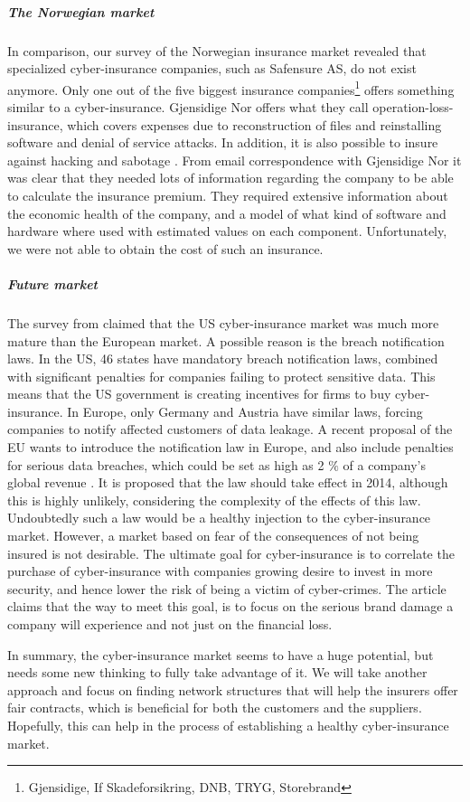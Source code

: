 \subparagraph{The Norwegian market}

In comparison, our survey of the Norwegian insurance market revealed that specialized cyber-insurance companies, such as Safensure AS, do not exist anymore. Only one out of the five biggest insurance companies\footnote{Gjensidige, If Skadeforsikring, DNB, TRYG, Storebrand} offers something similar to a cyber-insurance. Gjensidige Nor offers what they call operation-loss-insurance, which covers expenses due to reconstruction of files and reinstalling software and denial of service attacks. In addition, it is also possible to insure against hacking and sabotage \citep{gjensidige}. From email correspondence with Gjensidige Nor it was clear that they needed lots of information regarding the company to be able to calculate the insurance premium. They required extensive information about the economic health of the company, and a model of what kind of software and hardware where used with estimated values on each component. Unfortunately, we were not able to obtain the cost of such an insurance.
  
\subparagraph{Future market}
The survey from \cite{CFCunder} claimed that the US cyber-insurance market was much more mature than the European market. A possible reason is the breach notification laws. In the US, 46 states have mandatory breach notification laws, combined with significant penalties for companies failing to protect sensitive data. This means that the US government is creating incentives for firms to buy cyber-insurance.
 In Europe, only Germany and Austria have similar laws, forcing companies to notify affected customers of data leakage. A recent proposal of the EU wants to introduce the notification law in Europe, and also include penalties for serious data breaches, which could be set as high as 2 $\%$ of a company's global revenue \cite{CFCunder}. It is proposed that the law should take effect in 2014, although this is highly unlikely, considering the complexity of the effects of this law. Undoubtedly such a law would be a healthy injection to the cyber-insurance market. However, a market based on fear of the consequences of not being insured is not desirable. The ultimate goal for cyber-insurance is to correlate the purchase of cyber-insurance with companies growing desire to invest in more security, and hence lower the risk of being a victim of cyber-crimes. 
The article claims that the way to meet this goal, is to focus on the serious brand damage a company will experience and not just on the financial loss. 

In summary, the cyber-insurance market seems to have a huge potential, but needs some new thinking to fully take advantage of it. We will take another approach and focus on finding network structures that will help the insurers offer fair contracts, which is beneficial for both the customers and the suppliers. Hopefully, this can help in the process of establishing a healthy cyber-insurance market.

   
   
   
   
   
   
   
  

